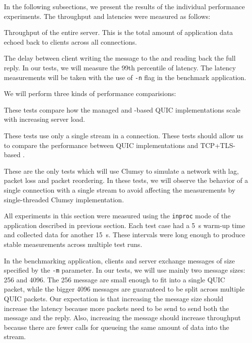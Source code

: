In the following subsections, we present the results of the individual performance experiments. The
throughput and latencies were measured as follows:

\begin{itemize}

   Throughput of the entire server. This is the total amount of application data
  echoed back to clients across all connections.

   The delay between client writing the message to the \Stream{} and reading back the
full reply. In our tests, we will measure the 99th percentile of latency. The latency measurements
will be taken with the use of \texttt{-n} flag in the benchmark application.

\end{itemize}

We will perform three kinds of performance comparisions:

\begin{itemize}

   These tests compare how the managed and \libmsquic{}-based
QUIC implementations scale with increasing server load.

   These tests use only a single stream in a connection. These
tests should allow us to compare the performance between QUIC implementations and TCP+TLS-based
\SslStream{}.

   These are the only tests which will use Clumsy
to simulate a network with lag, packet loss and packet reordering. In these tests, we will observe
the behavior of a single connection with a single stream to avoid affecting the measurements by
single-threaded Clumsy implementation.

\end{itemize}

All experiments in this section were measured using the \texttt{inproc} mode of the application
described in previous section. Each test case had a \SI{5}{\second} warm-up time and collected data
for another \SI{15}{\second}. These intervals were long enough to produce stable measurements across
multiple test runs.

In the benchmarking application, clients and server exchange messages of size specified by the
\texttt{-m} parameter. In our tests, we will use mainly two message sizes: \SI{256}{\byte} and
\SI{4096}{\byte}. The \SI{256}{\byte} message are small enough to fit into a single QUIC packet,
while the bigger \SI{4096}{\byte} messages are guaranteed to be split across multiple QUIC packets.
Our expectation is that increasing the message size should increase the latency because more packets
need to be send to send both the message and the reply. Also, increasing the message should increase
throughput because there are fewer calls for queueing the same amount of data into the stream.

